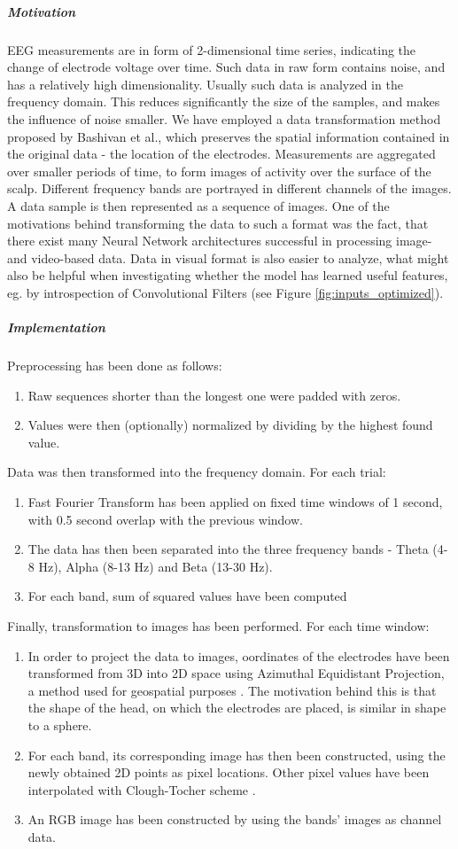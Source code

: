 \documentclass{article}
\begin{document}
\subparagraph{Motivation} EEG measurements are in form of 2-dimensional time series, indicating the change of electrode voltage over time. Such data in raw form contains noise, and has a relatively high dimensionality. Usually such data is analyzed in the frequency domain. This reduces significantly the size of the samples, and makes the influence of noise smaller. We have employed a data transformation method proposed by Bashivan et al.\cite{learning_eeg_repr}, which preserves the spatial information contained in the original data - the location of the electrodes. Measurements are aggregated over smaller periods of time, to form images of activity over the surface of the scalp. Different frequency bands are portrayed in different channels of the images. A data sample is then represented as a sequence of images. One of the motivations behind transforming the data to such a format was the fact, that there exist many Neural Network architectures successful in processing image- and video-based data. Data in visual format is also easier to analyze, what might also be helpful when investigating whether the model has learned useful features, eg. by introspection of Convolutional Filters (see Figure \ref{fig:inputs_optimized}).

\subparagraph{Implementation} Preprocessing has been done as follows:

\begin{enumerate}
 \item Raw sequences shorter than the longest one were padded with zeros.
 \item Values were then (optionally) normalized by dividing by the highest found value.
\end{enumerate}
Data was then transformed into the frequency domain. For each trial:
\begin{enumerate}[resume]
 \item Fast Fourier Transform has been applied on fixed time windows of 1 second, with 0.5 second overlap 		with the previous window.
 \item The data has then been separated into the three frequency bands - Theta (4-8 Hz), Alpha (8-13 Hz) and Beta (13-30 Hz).
 \item For each band, sum of squared values have been computed
\end{enumerate}
Finally, transformation to images has been performed. For each time window:
\begin{enumerate}[resume]
 \item In order to project the data to images, oordinates of the electrodes have been transformed from 3D into 2D space using Azimuthal Equidistant Projection, a method used for geospatial purposes \cite{snyder}.
 The motivation behind this is that the shape of the head, on which the electrodes are placed, is similar in shape to a sphere.
 \item For each band, its corresponding image has then been constructed, using the newly obtained 2D points as pixel locations. Other pixel values have been interpolated with Clough-Tocher scheme \cite{alfeld}.
 \item An RGB image has been constructed by using the bands' images as channel data.  
\end{enumerate}
\end{document}
